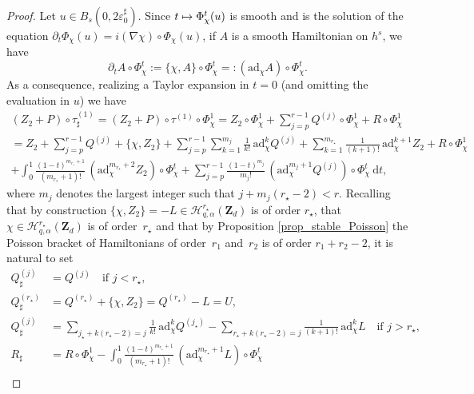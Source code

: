 \documentclass[JEP,XML,SOM,Unicode,NoEqCountersInSection,published]{cedram}
\newcommand\mto{\mathchoice{\longmapsto}{\mapsto}{\mapsto}{\mapsto}}
\theoremstyle{definition}
\begin{document}
\begin{proof}
Let $u\in B_s(0,2 \varepsilon_0^\sharp)$. Since $t\mto \Phi_\chi^t(u)$ is smooth and is the solution of the equation $\partial_t \Phi_\chi(u) = i (\nabla \chi)\circ \Phi_\chi(u)$, if $A$ is a smooth Hamiltonian on $h^s$, we have\vspace*{-3pt}
\[
\partial_t A \circ \Phi_\chi^t:= \{\chi, A \} \circ \Phi_\chi^t=: (\mathrm{ad}_{\chi} A) \circ \Phi_\chi^t.
\]
As a consequence, realizing a Taylor expansion in $t=0$ (and omitting the evaluation in $u$) we have\vspace*{-11pt}
\begin{multline*}
(Z_2+P)\circ \tau^{(1)}_\sharp = (Z_2+P)\circ \tau^{(1)} \circ \Phi_\chi^1
= Z_2 \circ \Phi_\chi^1 + \sum_{j=p}^{r-1} Q^{(j)} \circ \Phi_\chi^1 + R \circ \Phi_\chi^1 \\[-2pt]
= Z_2 + \sum_{j=p}^{r-1} Q^{(j)} + \{\chi,Z_2\} + \sum_{j=p}^{r-1} \sum_{k=1}^{m_{j}} \frac1{k !}\, \mathrm{ad}_{\chi}^k Q^{(j)} + \sum_{k=1}^{m_{r_\star}} \frac1{(k+1) !}\, \mathrm{ad}_{\chi}^{k+1} Z_2 + R \circ \Phi_\chi^1 \\[-2pt]
+ \int_0^1 \frac{(1-t)^{m_{r_\star} +1 }}{(m_{r_\star} +1) !}\, (\mathrm{ad}_{\chi}^{m_{r_\star} +2} Z_2)\circ \Phi_\chi^t + \sum_{j=p}^{r-1} \frac{(1-t)^{m_j}}{m_j !}\, (\mathrm{ad}_{\chi}^{m_j+1} Q^{(j)}) \circ \Phi_\chi^t \ \mathrm{d}t,
\end{multline*}
where $m_j$ denotes the largest integer such that $j+m_j (r_\star -2) < r$. Recalling that by construction $\{\chi,Z_2\} = -L \in \mathscr{H}_{q,\alpha}^{r_\star}(\mathbf{Z}_d)$ is of order $r_\star$, that $\chi \in \mathscr{H}_{q,\alpha}^{r_\star}(\mathbf{Z}_d)$ is of order~$r_\star$ and that by Proposition \ref{prop_stable_Poisson} the Poisson bracket of Hamiltonians of order~$r_1$ and~$r_2$ is of order $r_1+r_2-2$, it is natural to set\vspace*{-1pt}
\begin{align*}
Q^{(j)}_\sharp &= Q^{(j)} \quad \text{if } j < r_\star,\\[-2pt]
Q^{(r_\star)}_\sharp &= Q^{(r_\star)}+ \{\chi,Z_2\} = Q^{(r_\star)} - L =U,\\[-2pt]
Q^{(j)}_\sharp &= \sum_{ j_\star+k(r_\star - 2)= j} \frac1{k !}\, \mathrm{ad}_{\chi}^k Q^{(j_\star)} - \sum_{ r_\star+k(r_\star - 2)= j} \frac1{(k+1) !}\, \mathrm{ad}_{\chi}^k L \quad \text{if } j > r_\star,\\
R_\sharp&= R \circ \Phi_\chi^1
- \int_0^1 \frac{(1-t)^{m_{r_\star} +1 }}{(m_{r_\star} +1) !}\, (\mathrm{ad}_{\chi}^{m_{r_\star} +1} L)\circ \Phi_\chi^t\\[-5pt]

\end{align*}
\end{proof}
\end{document}
